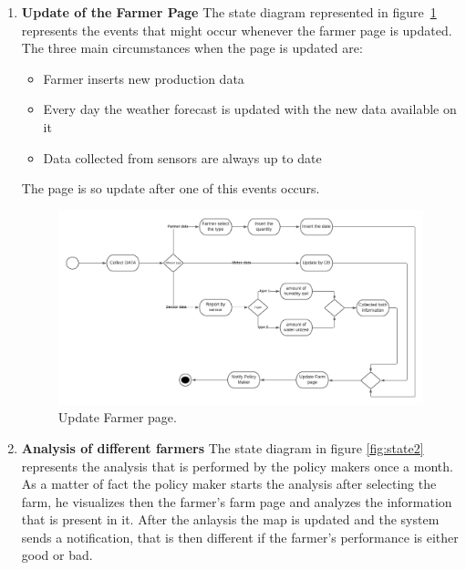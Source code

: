 \begin{enumerate}
    \item \textbf{Update of the Farmer Page}
        The state diagram represented in figure~\ref{fig:state1} represents 
        the events that might occur whenever the farmer page is updated.
        The three main circumstances when the page is updated are:
        \begin {itemize}
        \item Farmer inserts new production data
        \item Every day the weather forecast is updated with the new data available on it
        \item Data collected from sensors are always up to date
        \end{itemize}
        The page is so update after one of this events occurs.

    \begin{figure}[H]
        \begin{center}
        \includegraphics[width=1\textwidth]{images/State chart 1.png}
        \caption{Update Farmer page.}
        \label{fig:state1}
        \end{center}
    \end{figure}

    \item \textbf{Analysis of different farmers}
    The state diagram in figure \ref{fig:state2} represents the analysis that is performed 
    by the policy makers once a month.
    As a matter of fact the policy maker starts the analysis after selecting the farm, he visualizes then the farmer's farm page and analyzes the information 
    that is present in it. After the anlaysis the map is updated and the system sends a notification, that is then different if the 
    farmer’s performance is either good or bad.


\end{enumerate}
